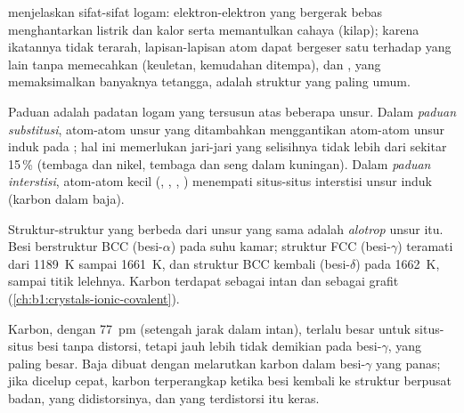 \begin{proposition}\label{prop:b1:crystals-metals:properties}
 menjelaskan sifat-sifat logam: elektron-elektron yang
bergerak bebas menghantarkan listrik dan kalor serta memantulkan cahaya
(kilap); karena ikatannya tidak terarah, lapisan-lapisan atom dapat
bergeser satu terhadap yang lain tanpa memecahkan  (keuletan,
kemudahan ditempa), dan , yang memaksimalkan banyaknya
tetangga, adalah struktur yang paling umum.
\end{proposition}
\admitted

\begin{definition}[Paduan]\label{def:b1:crystals-metals:alloy}
Paduan adalah padatan logam yang tersusun atas beberapa unsur. Dalam
\emph{paduan substitusi}, atom-atom unsur yang
ditambahkan menggantikan atom-atom unsur induk pada ; hal ini
memerlukan jari-jari yang selisihnya tidak lebih dari sekitar 15\,\%
(tembaga dan nikel, tembaga dan seng dalam kuningan). Dalam
\emph{paduan interstisi}, atom-atom kecil
(, , , ) menempati situs-situs interstisi unsur
induk (karbon dalam baja).
\end{definition}

\begin{definition}[Alotropi]\label{def:b1:crystals-metals:allotropy}
Struktur-struktur  yang berbeda dari unsur yang sama adalah
\emph{alotrop} unsur itu. Besi berstruktur BCC
(besi-$\alpha$) pada suhu kamar; struktur FCC (besi-$\gamma$) teramati
dari \qty{1189}{K} sampai \qty{1661}{K}, dan struktur BCC kembali
(besi-$\delta$) pada \qty{1662}{K}, sampai titik lelehnya. Karbon
terdapat sebagai intan dan sebagai grafit
(\cref{ch:b1:crystals-ionic-covalent}).
\end{definition}

\begin{example}[Baja]\label{ex:b1:crystals-metals:steel}
Karbon, dengan  \qty{77}{pm} (setengah jarak 
dalam intan), terlalu besar untuk situs-situs besi tanpa distorsi, tetapi
jauh lebih tidak demikian pada besi-$\gamma$, yang 
paling besar. Baja dibuat dengan melarutkan karbon dalam besi-$\gamma$
yang panas; jika dicelup cepat, karbon terperangkap ketika besi kembali
ke struktur berpusat badan, yang didistorsinya, dan  yang
terdistorsi itu keras.
\end{example}


